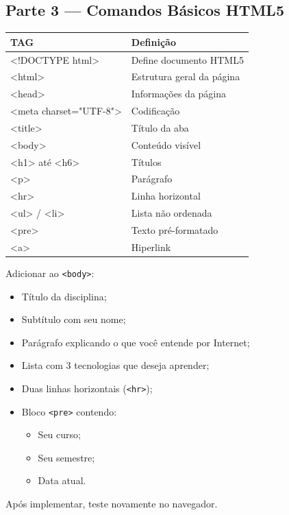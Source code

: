 \documentclass[12pt,a4paper]{article}
\begin{document}
\subsection{Parte 3 — Comandos Básicos HTML5}

\begin{boxTabela}
\begin{tabular}{|p{3cm}|p{13cm}|}
\hline
\rowcolor{pretoTabela}
\color{white}\textbf{TAG} & 
\color{white}\textbf{Definição} \\
\hline
<!DOCTYPE html> & Define documento HTML5 \\
<html> & Estrutura geral da página \\
<head> & Informações da página \\
<meta charset="UTF-8"> & Codificação \\
<title> & Título da aba \\
<body> & Conteúdo visível \\
<h1> até <h6> & Títulos \\
<p> & Parágrafo \\
<hr> & Linha horizontal \\
<ul> / <li> & Lista não ordenada \\
<pre> & Texto pré-formatado \\
<a> & Hiperlink \\
\hline
\end{tabular}
\end{boxTabela}

\begin{boxAtividade}

Adicionar ao \texttt{<body>}:

\begin{itemize}
\item Título da disciplina;
\item Subtítulo com seu nome;
\item Parágrafo explicando o que você entende por Internet;
\item Lista com 3 tecnologias que deseja aprender;
\item Duas linhas horizontais (\texttt{<hr>});
\item Bloco \texttt{<pre>} contendo:
    \begin{itemize}
        \item Seu curso;
        \item Seu semestre;
        \item Data atual.
    \end{itemize}
\end{itemize}

Após implementar, teste novamente no navegador.

\end{boxAtividade}
\end{document}
